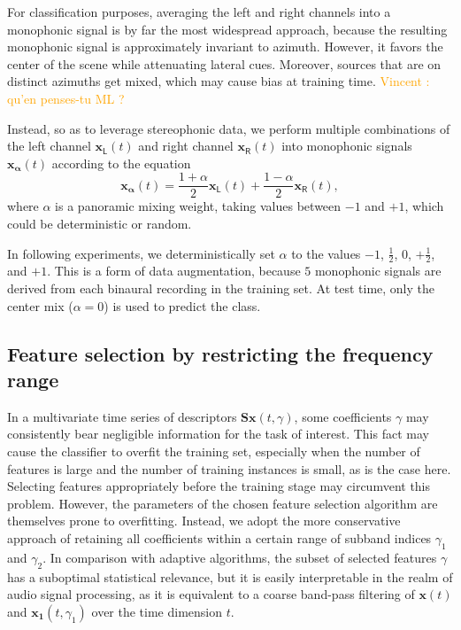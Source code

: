 \documentclass[journal]{IEEEtran}
\newcommand{\vl}[1]{\textcolor{orange}{Vincent : #1}}
\begin{document}
For classification purposes, averaging the left and right channels into a monophonic signal is by far the most widespread approach, because the resulting monophonic signal is approximately invariant to azimuth.
However, it favors the center of the scene while attenuating lateral cues.
Moreover, sources that are on distinct azimuths get mixed, which may cause bias at training time.
\vl{qu'en penses-tu ML ?}

Instead, so as to leverage stereophonic data, we perform multiple combinations of the left channel $\boldsymbol{x_{\mathsf{L}}}(t)$ and right channel $\boldsymbol{x_{\mathsf{R}}}(t)$ into monophonic signals $\boldsymbol{x_{\alpha}}(t)$ according to the equation
\begin{equation}  
\boldsymbol{x_{\alpha}}(t) =
\dfrac{1+\alpha}{2} \boldsymbol{x_\mathsf{L}}(t) +
\dfrac{1-\alpha}{2} \boldsymbol{x_\mathsf{R}}(t),
\end{equation}
where $\alpha$ is a panoramic mixing weight, taking values between $-1$ and $+1$, which could be deterministic or random.

In following experiments, we deterministically set $\alpha$ to the values $-1$, $\frac{1}{2}$, $0$, $+\frac{1}{2}$, and $+1$.
This is a form of data augmentation, because $5$ monophonic signals are derived from each binaural recording in the training set.
At test time, only the center mix ($\alpha = 0$) is used to predict the class.

\subsection{Feature selection by restricting the frequency range}
In a multivariate time series of descriptors $\mathbf{S}\boldsymbol{x}(t,\gamma)$, some coefficients $\gamma$ may consistently bear negligible information for the task of interest.
This fact may cause the classifier to overfit the training set, especially when the number of features is large and the number of training instances is small, as is the case here.
Selecting features appropriately before the training stage may circumvent this problem.
However, the parameters of the chosen feature selection algorithm are themselves prone to overfitting.
Instead, we adopt the more conservative approach of retaining all coefficients within a certain range of subband indices $\gamma_1$ and $\gamma_2$.
In comparison with adaptive algorithms, the subset of selected features $\gamma$ has a suboptimal statistical relevance, but it is easily interpretable in the realm of audio signal processing, as it is equivalent to a coarse band-pass filtering of $\boldsymbol{x}(t)$ and $\boldsymbol{x_1}(t,\gamma_1)$ over the time dimension $t$.
\end{document}
